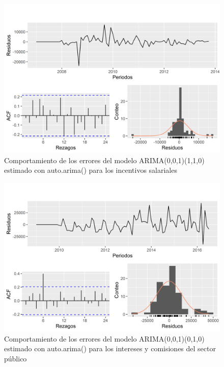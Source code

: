 \documentclass[
]{article}
\begin{document}
\begin{figure}[H]
\includegraphics[width=1\linewidth,height=1\textheight]{Tesis_files/figure-latex/errores_reales_autoarima3-1} \caption{Comportamiento de los errores del modelo ARIMA(0,0,1)(1,1,0) estimado con auto.arima() para los incentivos salariales}\label{fig:errores_reales_autoarima3}
\end{figure}

\begin{figure}[H]
\includegraphics[width=1\linewidth,height=1\textheight]{Tesis_files/figure-latex/errores_reales_autoarima4-1} \caption{Comportamiento de los errores del modelo ARIMA(0,0,1)(0,1,0) estimado con auto.arima() para los intereses y comisiones del sector público}\label{fig:errores_reales_autoarima4}
\end{figure}
\end{document}
